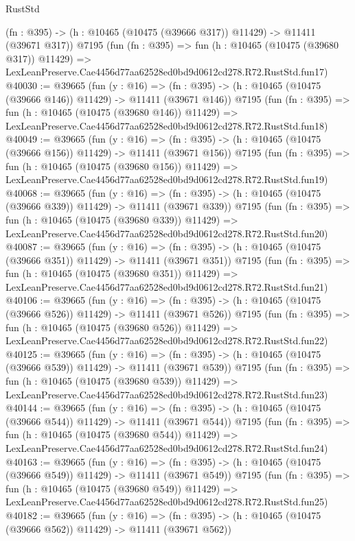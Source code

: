 \begin{lexlean}{RustStd}
\begin{coremodule}
    (fn : @395) -> (h : @10465 (@10475 (@39666 @317)) @11429) -> @11411 (@39671 @317))
    @7195
    (fun (fn : @395) =>
    fun (h : @10465 (@10475 (@39680 @317)) @11429) =>
    LexLeanPreserve.Cae4456d77aa62528ed0bd9d0612cd278.R72.RustStd.fun17)
@40030 := @39665
    (fun (y : @16) =>
    (fn : @395) -> (h : @10465 (@10475 (@39666 @146)) @11429) -> @11411 (@39671 @146))
    @7195
    (fun (fn : @395) =>
    fun (h : @10465 (@10475 (@39680 @146)) @11429) =>
    LexLeanPreserve.Cae4456d77aa62528ed0bd9d0612cd278.R72.RustStd.fun18)
@40049 := @39665
    (fun (y : @16) =>
    (fn : @395) -> (h : @10465 (@10475 (@39666 @156)) @11429) -> @11411 (@39671 @156))
    @7195
    (fun (fn : @395) =>
    fun (h : @10465 (@10475 (@39680 @156)) @11429) =>
    LexLeanPreserve.Cae4456d77aa62528ed0bd9d0612cd278.R72.RustStd.fun19)
@40068 := @39665
    (fun (y : @16) =>
    (fn : @395) -> (h : @10465 (@10475 (@39666 @339)) @11429) -> @11411 (@39671 @339))
    @7195
    (fun (fn : @395) =>
    fun (h : @10465 (@10475 (@39680 @339)) @11429) =>
    LexLeanPreserve.Cae4456d77aa62528ed0bd9d0612cd278.R72.RustStd.fun20)
@40087 := @39665
    (fun (y : @16) =>
    (fn : @395) -> (h : @10465 (@10475 (@39666 @351)) @11429) -> @11411 (@39671 @351))
    @7195
    (fun (fn : @395) =>
    fun (h : @10465 (@10475 (@39680 @351)) @11429) =>
    LexLeanPreserve.Cae4456d77aa62528ed0bd9d0612cd278.R72.RustStd.fun21)
@40106 := @39665
    (fun (y : @16) =>
    (fn : @395) -> (h : @10465 (@10475 (@39666 @526)) @11429) -> @11411 (@39671 @526))
    @7195
    (fun (fn : @395) =>
    fun (h : @10465 (@10475 (@39680 @526)) @11429) =>
    LexLeanPreserve.Cae4456d77aa62528ed0bd9d0612cd278.R72.RustStd.fun22)
@40125 := @39665
    (fun (y : @16) =>
    (fn : @395) -> (h : @10465 (@10475 (@39666 @539)) @11429) -> @11411 (@39671 @539))
    @7195
    (fun (fn : @395) =>
    fun (h : @10465 (@10475 (@39680 @539)) @11429) =>
    LexLeanPreserve.Cae4456d77aa62528ed0bd9d0612cd278.R72.RustStd.fun23)
@40144 := @39665
    (fun (y : @16) =>
    (fn : @395) -> (h : @10465 (@10475 (@39666 @544)) @11429) -> @11411 (@39671 @544))
    @7195
    (fun (fn : @395) =>
    fun (h : @10465 (@10475 (@39680 @544)) @11429) =>
    LexLeanPreserve.Cae4456d77aa62528ed0bd9d0612cd278.R72.RustStd.fun24)
@40163 := @39665
    (fun (y : @16) =>
    (fn : @395) -> (h : @10465 (@10475 (@39666 @549)) @11429) -> @11411 (@39671 @549))
    @7195
    (fun (fn : @395) =>
    fun (h : @10465 (@10475 (@39680 @549)) @11429) =>
    LexLeanPreserve.Cae4456d77aa62528ed0bd9d0612cd278.R72.RustStd.fun25)
@40182 := @39665
    (fun (y : @16) =>
    (fn : @395) -> (h : @10465 (@10475 (@39666 @562)) @11429) -> @11411 (@39671 @562))

\end{coremodule}
\end{lexlean}
